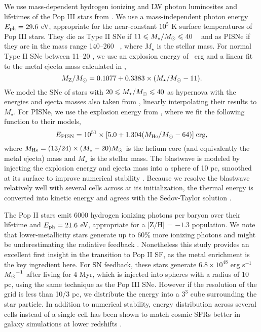 \documentclass[useAMS,usenatbib]{mn2e}
\begin{document}
We use mass-dependent hydrogen ionizing and LW photon luminosites and
lifetimes of the Pop III stars from \citet{Schaerer02}.  We use a
mass-independent photon energy $E_{\rm ph} = 29.6$ eV, appropriate for
the near-constant $10^5$ K surface temperatures of Pop III stars.
They die as Type II SNe if $11 \le M_\star/\Ms \le 40$
\Ms~\citep{Woosley95} and as PISNe if they are in the mass range
140--260 \Ms~\citep{Heger03}, where $M_\star$ is the stellar mass.
For normal Type II SNe between 11--20 \Ms, we use an explosion energy
of ~erg and a linear fit to the metal ejecta mass calculated
in \citet{Nomoto06},
%
\begin{equation}
  \label{eqn:typeii}
  M_{\rm Z}/\Ms = 0.1077 + 0.3383 \times (M_\star/\Ms - 11).
\end{equation}
%
We model the SNe of stars with $20 \le M_\star/\Ms \le 40$ as
hypernova with the energies and ejecta masses also taken from
\citeauthor{Nomoto06}, linearly interpolating their results to
$M_\star$.  For PISNe, we use the explosion energy from
\citet{Heger02}, where we fit the following function to their models,
%
\begin{equation}
  \label{eqn:pisn}
  E_{\rm PISN} = 10^{51} \times [5.0 + 1.304 (M_{\rm He}/\Ms - 64)] \; \mathrm{erg},
\end{equation}
%
where $M_{\rm He} = (13/24) \times (M_\star - 20) \Ms$ is the helium
core (and equivalently the metal ejecta) mass and $M_\star$ is the
stellar mass.  The blastwave is modeled by injecting the explosion
energy and ejecta mass into a sphere of 10 pc, smoothed at its surface
to improve numerical stability \citep{Wise08_Gal}.  Because we resolve
the blastwave relatively well with several cells across at its
initialization, the thermal energy is converted into kinetic energy
and agrees with the Sedov-Taylor solution \citep[e.g.][]{Greif07}.

The Pop II stars emit 6000 hydrogen ionizing photons per baryon over
their lifetime and $E_{\rm ph} = 21.6$ eV, appropriate for a [Z/H] =
$-1.3$ population.  We note that lower-metallicity stars generate up
to 60\% more ionizing photons and might be underestimating the
radiative feedback \citep{Schaerer03}.  Nonetheless this study
provides an excellent first insight in the transition to Pop II SF, as
the metal enrichment is the key ingredient here.  For SN feedback,
these stars generate $6.8 \times 10^{48}$ erg s$^{-1}$ $\Ms^{-1}$
after living for 4 Myr, which is injected into spheres with a radius
of 10 pc, using the same technique as the Pop III SNe.  However if the
resolution of the grid is less than 10/3 pc, we distribute the energy
into a $3^3$ cube surrounding the star particle.  In addition to
numerical stability, energy distribution across several cells instead
of a single cell has been shown to match cosmic SFRs better in galaxy
simulations at lower redshifts \citep{Smith10}.
\end{document}
